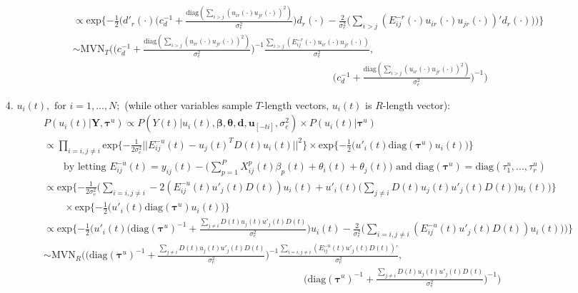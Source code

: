 \documentclass[a4paper]{article}
\begin{document}
\begin{itemize}
\begin{equation*}
\begin{aligned}
	&\propto\mbox{exp}\{-\frac{1}{2}\Big(d'_r(\cdot)\Big(c_d^{-1}+\frac{\mbox{diag}(\sum_{i>j}({u_{ir}(\cdot)u_{jr}(\cdot)})^2)}{\sigma_e^2}\Big)d_r(\cdot)-\frac{2}{\sigma_e^2}\Big(\sum_{i>j}(E^{-r}_{ij}(\cdot)u_{ir}(\cdot)u_{jr}(\cdot))'d_r(\cdot)\Big)\Big)\}\\
	& \sim \mbox{MVN}_T(\Big(c_d^{-1}+\frac{\mbox{diag}(\sum_{i>j}({u_{ir}(\cdot)u_{jr}(\cdot)})^2)}{\sigma_e^2}\Big)^{-1}\frac{\sum_{i>j}(E^{-r}_{ij}(\cdot)u_{ir}(\cdot)u_{jr}(\cdot))}{\sigma_e^2},\\&\quad\quad\quad\quad\quad\quad\quad\quad\quad\quad\quad\quad\quad\quad\quad\quad\quad\quad\quad\quad\quad\quad\quad\quad\quad\quad \Big(c_d^{-1}+\frac{\mbox{diag}(\sum_{i>j}({u_{ir}(\cdot)u_{jr}(\cdot)})^2)}{\sigma_e^2}\Big)^{-1})
	\end{aligned}
	\end{equation*} 
		\item [4.] $u_i(t), \mbox{ for } i=1,...,N;$ (while other variables sample $T$-length vectors, $u_i(t)$ is $R$-length vector):
			\begin{equation*}
			\begin{aligned}
			&P(u_i(t)|\boldsymbol{Y}, \boldsymbol{\tau}^u) \propto P(Y(t)|u_{i}(t), \boldsymbol{\beta}, \boldsymbol{\theta}, \boldsymbol{d}, \boldsymbol{u}_{[-ti]},\sigma_e^2) \times P(u_{i}(t)|\boldsymbol{\tau}^u) \\
				&\propto\prod\limits_{i=i, j\neq i}\mbox{exp}\{-\frac{1}{2\sigma_e^2}||E^{-u}_{ij}(t)-u_{j}(t)^TD(t)u_{i}(t)||^2\}\times \mbox{exp}\{-\frac{1}{2}\Big(u'_{i}(t)\mbox{diag}(\boldsymbol{\tau}^u)u_{i}(t)\Big)\}\\
				& \quad\quad\mbox{by letting } E^{-u}_{ij}(t)=y_{ij}(t)-\big(\sum_{p=1 }^PX^p_{ij}(t)\beta_p(t)+\theta_i(t)+\theta_j(t)\big) \mbox{ and } \mbox{diag}(\boldsymbol{\tau}^u) = \mbox{diag}(\tau^{u}_1, ..., \tau^{u}_r)\\
				&\propto\mbox{exp}\{-\frac{1}{2\sigma_e^2}\Big(\sum\limits_{i=i, j\neq i}-2(E^{-u}_{ij}(t)u'_{j}(t)D(t))u_i(t)+u'_i(t)\Big(\sum\limits_{j\neq i}D(t)u_{j}(t)u'_j(t)D(t)\Big)u_i(t)\Big)\}\\&\quad\quad\times \mbox{exp}\{-\frac{1}{2}\Big(u'_{i}(t)\mbox{diag}(\boldsymbol{\tau}^u)u_{i}(t)\Big)\}\\
				&\propto\mbox{exp}\{-\frac{1}{2}\Big(u'_i(t)\Big(\mbox{diag}(\boldsymbol{\tau}^u)^{-1}+\frac{\sum\limits_{j\neq i}D(t)u_{j}(t)u'_j(t)D(t)}{\sigma_e^2}\Big)u_i(t)-\frac{2}{\sigma_e^2}\Big(\sum_{i=i, j\neq i}(E^{-u}_{ij}(t)u'_{j}(t)D(t))u_i(t)\Big)\Big)\}\\
				& \sim \mbox{MVN}_R(\Big(\mbox{diag}(\boldsymbol{\tau}^u)^{-1}+\frac{\sum\limits_{j\neq i}D(t)u_{j}(t)u'_j(t)D(t)}{\sigma_e^2}\Big)^{-1}\frac{\sum_{i=i, j\neq i}(E^{-u}_{ij}(t)u'_{j}(t)D(t))'}{{\sigma_e^2}},\\&\quad\quad\quad\quad\quad\quad\quad\quad\quad\quad\quad\quad\quad\quad\quad\quad\quad\quad\quad\quad\quad\quad\quad\quad\quad\quad \Big(\mbox{diag}(\boldsymbol{\tau}^u)^{-1}+\frac{\sum\limits_{j\neq i}D(t)u_{j}(t)u'_j(t)D(t)}{\sigma_e^2}\Big)^{-1})
					\end{aligned}
			\end{equation*} 
\end{itemize}
\end{document}
